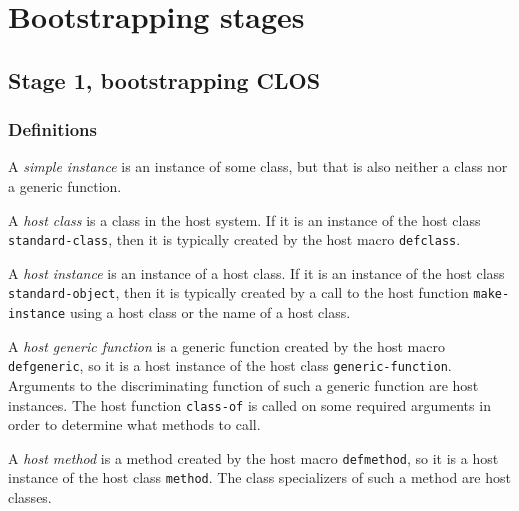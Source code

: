 \section{Bootstrapping stages}

\subsection{Stage 1, bootstrapping CLOS}

\subsubsection{Definitions}

\begin{definition}
A \emph{simple instance} is an instance of some class, but that is
also neither a class nor a generic function.
\end{definition}

\begin{definition}
A \emph{host class} is a class in the host system.  If it is an
instance of the host class \texttt{standard-class}, then it is
typically created by the host macro \texttt{defclass}.
\end{definition}

\begin{definition}
A \emph{host instance} is an instance of a host class.  If it is an
instance of the host class \texttt{standard-object}, then it is
typically created by a call to the host function
\texttt{make-instance} using a host class or the name of a host class.
\end{definition}

\begin{definition}
A \emph{host generic function} is a generic function created by the
host macro \texttt{defgeneric}, so it is a host instance of the host
class \texttt{generic-function}.  Arguments to the discriminating
function of such a generic function are host instances.  The host
function \texttt{class-of} is called on some required arguments in
order to determine what methods to call.
\end{definition}

\begin{definition}
A \emph{host method} is a method created by the host macro
\texttt{defmethod}, so it is a host instance of the host class
\texttt{method}.  The class specializers of such a method are host
classes.
\end{definition}

